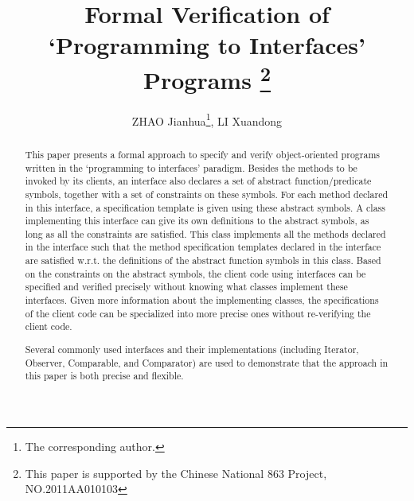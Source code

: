 \documentclass[fleqn]{llncs}
\begin{document}
\title{Formal Verification of `Programming to Interfaces' Programs
\thanks{This paper is supported by the Chinese National 863 Project, NO.2011AA010103}}
\author{ZHAO Jianhua\thanks{The corresponding author.}, LI Xuandong}

\maketitle

\newcommand{\seml}{[\![}
\newcommand{\semr}{]\!]}
\newcommand{\fldacc}{\mbox{}}
\newcommand{\outlying}{\texttt{Outlying}}
\begin{abstract}
This paper presents a formal approach to specify and verify object-oriented programs written in the
`programming to interfaces' paradigm. Besides the methods to be invoked by its clients, an interface
also declares a set of abstract function/predicate symbols, together with a set of constraints
on these symbols. For each method declared in this interface, a specification template is given using these abstract symbols.
A class implementing this interface can give its own definitions to the abstract symbols, as long as all the constraints are satisfied.
This class implements all the methods declared in the interface such that
the method specification templates declared in the interface are satisfied w.r.t. the definitions of the abstract function symbols in this class.
Based on the constraints on the abstract symbols, the client code using interfaces can be specified and verified precisely without knowing
what classes implement these interfaces. Given more information about the implementing classes, the
specifications of the client code can be specialized into more precise ones without re-verifying the client code.

Several commonly used interfaces and their implementations (including Iterator, Observer, Comparable, and Comparator) are used to
demonstrate that the approach in this paper is both precise and flexible.
\end{abstract}
\end{document}
